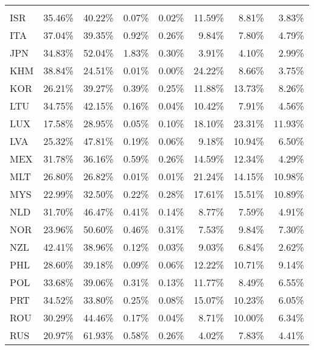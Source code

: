 \documentclass[a4paper,11pt]{article}
\begin{document}
\begin{table}[h]\small
  \centering
    \begin{tabular}{lrrrrrrr}
        \phantom{ISO3} & \phantom{dva\_fin} & \phantom{dva\_int} & \phantom{rdv} & \phantom{ddc} & \phantom{fva\_fin} & \phantom{fva\_int} & \phantom{fdc} \\
    ISR   & 35.46\% & 40.22\% & 0.07\% & 0.02\% & 11.59\% & 8.81\% & 3.83\% \\
    ITA   & 37.04\% & 39.35\% & 0.92\% & 0.26\% & 9.84\% & 7.80\% & 4.79\% \\
    JPN   & 34.83\% & 52.04\% & 1.83\% & 0.30\% & 3.91\% & 4.10\% & 2.99\% \\
    KHM   & 38.84\% & 24.51\% & 0.01\% & 0.00\% & 24.22\% & 8.66\% & 3.75\% \\
    KOR   & 26.21\% & 39.27\% & 0.39\% & 0.25\% & 11.88\% & 13.73\% & 8.26\% \\
    LTU   & 34.75\% & 42.15\% & 0.16\% & 0.04\% & 10.42\% & 7.91\% & 4.56\% \\
    LUX   & 17.58\% & 28.95\% & 0.05\% & 0.10\% & 18.10\% & 23.31\% & 11.93\% \\
    LVA   & 25.32\% & 47.81\% & 0.19\% & 0.06\% & 9.18\% & 10.94\% & 6.50\% \\
    MEX   & 31.78\% & 36.16\% & 0.59\% & 0.26\% & 14.59\% & 12.34\% & 4.29\% \\
    MLT   & 26.80\% & 26.82\% & 0.01\% & 0.01\% & 21.24\% & 14.15\% & 10.98\% \\
    MYS   & 22.99\% & 32.50\% & 0.22\% & 0.28\% & 17.61\% & 15.51\% & 10.89\% \\
    NLD   & 31.70\% & 46.47\% & 0.41\% & 0.14\% & 8.77\% & 7.59\% & 4.91\% \\
    NOR   & 23.96\% & 50.60\% & 0.46\% & 0.31\% & 7.53\% & 9.84\% & 7.30\% \\
    NZL   & 42.41\% & 38.96\% & 0.12\% & 0.03\% & 9.03\% & 6.84\% & 2.62\% \\
    PHL   & 28.60\% & 39.18\% & 0.09\% & 0.06\% & 12.22\% & 10.71\% & 9.14\% \\
    POL   & 33.68\% & 39.06\% & 0.31\% & 0.13\% & 11.77\% & 8.49\% & 6.55\% \\
    PRT   & 34.52\% & 33.80\% & 0.25\% & 0.08\% & 15.07\% & 10.23\% & 6.05\% \\
    ROU   & 30.29\% & 44.46\% & 0.17\% & 0.04\% & 8.71\% & 10.00\% & 6.34\% \\
    RUS   & 20.97\% & 61.93\% & 0.58\% & 0.26\% & 4.02\% & 7.83\% & 4.41\% \\

\end{tabular}
\end{table}
\end{document}
